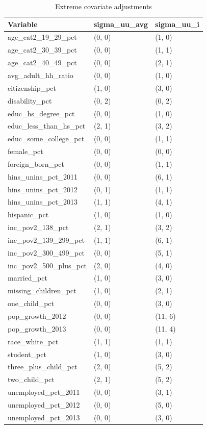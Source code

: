 \documentclass{article}
\begin{document}
\begin{appendix}
\begin{table}[ht]
\centering
    \caption{Extreme covariate adjustments}
    \label{tab:extreme1}
\begin{tabular}{lll}
  \hline
Variable & sigma\_uu\_avg & sigma\_uu\_i \\ 
  \hline
age\_cat2\_19\_29\_pct & (0, 0) & (1, 0) \\ 
  age\_cat2\_30\_39\_pct & (0, 0) & (1, 1) \\ 
  age\_cat2\_40\_49\_pct & (0, 0) & (2, 1) \\ 
  avg\_adult\_hh\_ratio & (0, 0) & (1, 0) \\ 
  citizenship\_pct & (1, 0) & (3, 0) \\ 
  disability\_pct & (0, 2) & (0, 2) \\ 
  educ\_hs\_degree\_pct & (0, 0) & (1, 0) \\ 
  educ\_less\_than\_hs\_pct & (2, 1) & (3, 2) \\ 
  educ\_some\_college\_pct & (0, 0) & (1, 1) \\ 
  female\_pct & (0, 0) & (0, 0) \\ 
  foreign\_born\_pct & (0, 0) & (1, 1) \\ 
  hins\_unins\_pct\_2011 & (0, 0) & (6, 1) \\ 
  hins\_unins\_pct\_2012 & (0, 1) & (1, 1) \\ 
  hins\_unins\_pct\_2013 & (1, 1) & (4, 1) \\ 
  hispanic\_pct & (1, 0) & (1, 0) \\ 
  inc\_pov2\_138\_pct & (2, 1) & (3, 2) \\ 
  inc\_pov2\_139\_299\_pct & (1, 1) & (6, 1) \\ 
  inc\_pov2\_300\_499\_pct & (0, 0) & (5, 1) \\ 
  inc\_pov2\_500\_plus\_pct & (2, 0) & (4, 0) \\ 
  married\_pct & (1, 0) & (3, 0) \\ 
  missing\_children\_pct & (1, 0) & (2, 1) \\ 
  one\_child\_pct & (0, 0) & (3, 0) \\ 
  pop\_growth\_2012 & (0, 0) & (11, 6) \\ 
  pop\_growth\_2013 & (0, 0) & (11, 4) \\ 
  race\_white\_pct & (1, 1) & (1, 1) \\ 
  student\_pct & (1, 0) & (3, 0) \\ 
  three\_plus\_child\_pct & (2, 0) & (5, 2) \\ 
  two\_child\_pct & (2, 1) & (5, 2) \\ 
  unemployed\_pct\_2011 & (0, 0) & (3, 1) \\ 
  unemployed\_pct\_2012 & (0, 0) & (5, 0) \\ 
  unemployed\_pct\_2013 & (0, 0) & (3, 0) \\ 
   \hline
\end{tabular}
\end{table}


\end{appendix}
\end{document}
